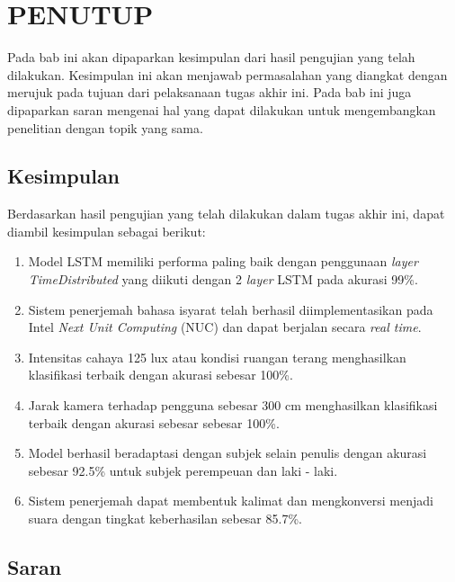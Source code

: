 \chapter{PENUTUP}
\label{chap:penutup}

Pada bab ini akan dipaparkan kesimpulan dari hasil pengujian yang telah dilakukan. Kesimpulan ini akan menjawab permasalahan yang diangkat dengan merujuk pada tujuan dari pelaksanaan tugas akhir ini. Pada bab ini juga dipaparkan saran mengenai hal yang dapat dilakukan untuk mengembangkan penelitian dengan topik yang sama.

\section{Kesimpulan}
\label{sec:kesimpulan}

Berdasarkan hasil pengujian yang telah dilakukan dalam tugas akhir ini, dapat diambil kesimpulan sebagai berikut:

\begin{enumerate}[nolistsep]

  \item Model LSTM memiliki performa paling baik dengan penggunaan \emph{layer TimeDistributed} yang diikuti dengan 2 \emph{layer} LSTM pada akurasi 99\%.
  \item Sistem penerjemah bahasa isyarat telah berhasil diimplementasikan pada Intel \emph{Next Unit Computing} (NUC) dan dapat berjalan secara \emph{real time}. 
  \item Intensitas cahaya 125 lux atau kondisi ruangan terang menghasilkan klasifikasi terbaik dengan akurasi sebesar 100\%.
  \item Jarak kamera terhadap pengguna sebesar 300 cm menghasilkan klasifikasi terbaik dengan akurasi sebesar sebesar 100\%.
  \item Model berhasil beradaptasi dengan subjek selain penulis dengan akurasi sebesar 92.5\% untuk subjek perempeuan dan laki - laki.
  \item Sistem penerjemah dapat membentuk kalimat dan mengkonversi menjadi suara dengan tingkat keberhasilan sebesar 85.7\%.


\end{enumerate}

\section{Saran}
\label{chap:saran}


